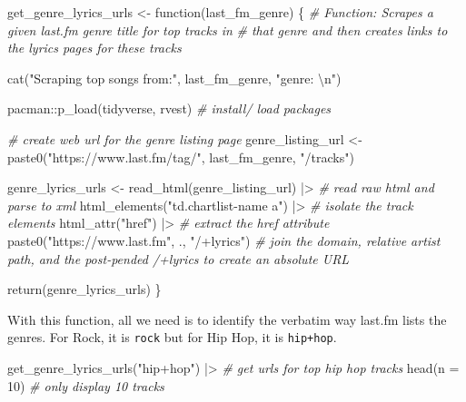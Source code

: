\documentclass[
  letterpaper,
]{scrbook}
\newenvironment{Shaded}{\begin{snugshade}}{\end{snugshade}}
\newcommand{\AttributeTok}[1]{\textcolor[rgb]{0.00,0.00,0.00}{#1}}
\newcommand{\CommentTok}[1]{\textcolor[rgb]{0.00,0.00,0.00}{\textit{#1}}}
\newcommand{\ControlFlowTok}[1]{\textcolor[rgb]{0.00,0.00,0.00}{#1}}
\newcommand{\DecValTok}[1]{\textcolor[rgb]{0.00,0.00,0.00}{#1}}
\newcommand{\FunctionTok}[1]{\textcolor[rgb]{0.00,0.00,0.00}{#1}}
\newcommand{\NormalTok}[1]{\textcolor[rgb]{0.00,0.00,0.00}{#1}}
\newcommand{\OtherTok}[1]{\textcolor[rgb]{0.00,0.00,0.00}{#1}}
\newcommand{\SpecialCharTok}[1]{\textcolor[rgb]{0.00,0.00,0.00}{#1}}
\newcommand{\StringTok}[1]{\textcolor[rgb]{0.00,0.00,0.00}{#1}}
\begin{document}
\begin{Shaded}
\begin{Highlighting}[]
\NormalTok{get\_genre\_lyrics\_urls }\OtherTok{\textless{}{-}} \ControlFlowTok{function}\NormalTok{(last\_fm\_genre) \{}
  \CommentTok{\# Function: Scrapes a given last.fm genre title for top tracks in}
  \CommentTok{\# that genre and then creates links to the lyrics pages for these tracks}
  
  \FunctionTok{cat}\NormalTok{(}\StringTok{"Scraping top songs from:"}\NormalTok{, last\_fm\_genre, }\StringTok{"genre: }\SpecialCharTok{\textbackslash{}n}\StringTok{"}\NormalTok{)}
  
\NormalTok{  pacman}\SpecialCharTok{::}\FunctionTok{p\_load}\NormalTok{(tidyverse, rvest) }\CommentTok{\# install/ load packages}
  
  \CommentTok{\# create web url for the genre listing page}
\NormalTok{  genre\_listing\_url }\OtherTok{\textless{}{-}} 
    \FunctionTok{paste0}\NormalTok{(}\StringTok{"https://www.last.fm/tag/"}\NormalTok{, last\_fm\_genre, }\StringTok{"/tracks"}\NormalTok{) }
  
\NormalTok{  genre\_lyrics\_urls }\OtherTok{\textless{}{-}} 
    \FunctionTok{read\_html}\NormalTok{(genre\_listing\_url) }\SpecialCharTok{|\textgreater{}} \CommentTok{\# read raw html and parse to xml}
    \FunctionTok{html\_elements}\NormalTok{(}\StringTok{"td.chartlist{-}name a"}\NormalTok{) }\SpecialCharTok{|\textgreater{}} \CommentTok{\# isolate the track elements}
    \FunctionTok{html\_attr}\NormalTok{(}\StringTok{"href"}\NormalTok{) }\SpecialCharTok{|\textgreater{}} \CommentTok{\# extract the href attribute}
    \FunctionTok{paste0}\NormalTok{(}\StringTok{"https://www.last.fm"}\NormalTok{, ., }\StringTok{"/+lyrics"}\NormalTok{) }\CommentTok{\# join the domain, relative artist path, and the post{-}pended /+lyrics to create an absolute URL}
  
  \FunctionTok{return}\NormalTok{(genre\_lyrics\_urls)}
\NormalTok{\}}
\end{Highlighting}
\end{Shaded}

With this function, all we need is to identify the verbatim way last.fm
lists the genres. For Rock, it is \texttt{rock} but for Hip Hop, it is
\texttt{hip+hop}.

\begin{Shaded}
\begin{Highlighting}[]
\FunctionTok{get\_genre\_lyrics\_urls}\NormalTok{(}\StringTok{"hip+hop"}\NormalTok{) }\SpecialCharTok{|\textgreater{}}  \CommentTok{\# get urls for top hip hop tracks}
  \FunctionTok{head}\NormalTok{(}\AttributeTok{n =} \DecValTok{10}\NormalTok{) }\CommentTok{\# only display 10 tracks}
\end{Highlighting}
\end{Shaded}
\end{document}
